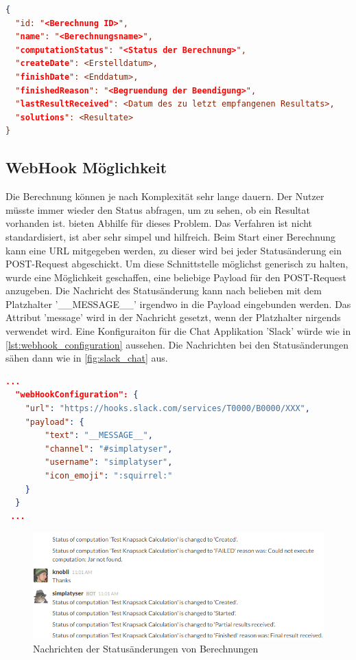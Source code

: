 \begin{lstlisting}[language=JSON, caption=Aufbau einer Antwort auf eine Statusabfrage, label=lst:status_response]  
{
  "id: "<Berechnung ID>",
  "name": "<Berechnungsname>",
  "computationStatus": "<Status der Berechnung>",
  "createDate": <Erstelldatum>,
  "finishDate": <Enddatum>,
  "finishedReason": "<Begruendung der Beendigung>",
  "lastResultReceived": <Datum des zu letzt empfangenen Resultats>,
  "solutions": <Resultate>
}
\end{lstlisting}

\subsection{WebHook Möglichkeit}
Die Berechnung können je nach Komplexität sehr lange dauern. Der Nutzer müsste immer wieder den Status abfragen, um zu sehen, ob ein Resultat vorhanden ist.  
bieten Abhilfe für dieses Problem. Das Verfahren ist nicht standardisiert, ist aber sehr simpel und hilfreich. Beim Start einer Berechnung kann eine URL mitgegeben werden, zu dieser 
wird bei jeder Statusänderung ein POST-Request abgeschickt. Um diese Schnittstelle möglichst generisch zu halten, wurde eine Möglichkeit geschaffen, eine beliebige Payload für den 
POST-Request anzugeben. Die Nachricht des Statusänderung kann nach belieben mit dem Platzhalter '\_\_MESSAGE\_\_' irgendwo in die Payload eingebunden werden. Das Attribut 'message' 
wird in der Nachricht gesetzt, wenn der Platzhalter nirgends verwendet wird. Eine Konfiguraiton für die Chat Applikation 'Slack' würde wie in \autoref{lst:webhook_configuration} 
aussehen. Die Nachrichten bei den Statusänderungen sähen dann wie in \autoref{fig:slack_chat} aus.

\begin{lstlisting}[language=JSON, caption=Beispiel einer WebHook Konfiguration für Slack, label=lst:webhook_configuration]
  ...  
  "webHookConfiguration": {
    "url": "https://hooks.slack.com/services/T0000/B0000/XXX",
    "payload": {
        "text": "__MESSAGE__",
        "channel": "#simplatyser",
        "username": "simplatyser",
        "icon_emoji": ":squirrel:"
    }
  }
 ...
\end{lstlisting}

\begin{figure}[h]
\centering
\includegraphics[scale=0.8]{images/slack_chat.png}
\caption[Nachrichten der Statusänderungen von Berechnungen]{Nachrichten der Statusänderungen von Berechnungen \selfmade{}}
\label{fig:slack_chat}
\end{figure}

